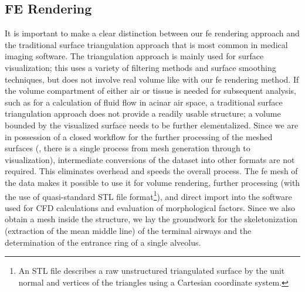 \subsection{FE \threed Rendering}
It is important to make a clear distinction between our \ac{fe} \threed rendering approach and the traditional surface triangulation approach that is most common in medical imaging software. The triangulation approach is mainly used for surface visualization; this uses a variety of filtering methods and surface smoothing techniques, but does not involve real volume like with our \ac{fe} \threed rendering method. If the volume compartment of either air or tissue is needed for subsequent analysis, such as for a calculation of fluid flow in acinar air space, a traditional surface triangulation approach does not provide a readily usable \threed structure; a volume bounded by the visualized surface needs to be further elementalized. Since we are in possession of a closed workflow for the further processing of the meshed surfaces (\ie, there is a single process from mesh generation through to visualization), intermediate conversions of the dataset into other formats are not required. This eliminates overhead and speeds the overall process. The \ac{fe} mesh of the data makes it possible to use it for volume rendering, further processing (with the use of quasi-standard \acs{STL} file format\footnote{An \acs{STL} file describes a raw unstructured triangulated surface by the unit normal and vertices of the triangles using a \threed Cartesian coordinate system.}), and direct import into the software used for \ac{CFD} calculations and evaluation of morphological factors. Since we also obtain a mesh inside the structure, we lay the groundwork for the skeletonization (extraction of the mean middle line) of the terminal airways and the determination of the entrance ring of a single alveolus.

